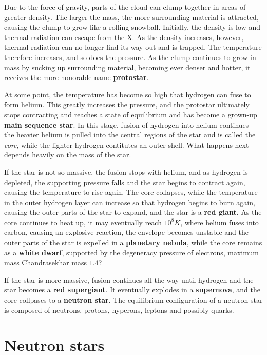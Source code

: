 Due to the force of gravity, parts of the cloud can clump together in areas of greater density.
The larger the mass, the more surrounding material is attracted, causing the clump to grow like a rolling snowball.
Initially, the density is low and thermal radiation can escape from the X.
As the density increases, however, thermal radiation can no longer find its way out and is trapped.
The temperature therefore increases, and so does the pressure.
As the clump continues to grow in mass by sucking up surrounding material, becoming ever denser and hotter, it receives the more honorable name \textbf{protostar}.

At some point, the temperature has become so high that hydrogen can fuse to form helium.
This greatly increases the pressure, and the protostar ultimately stops contracting and reaches a state of equilibrium and has become a grown-up \textbf{main sequence star}.
In this stage, fusion of hydrogen into helium continues -- the heavier helium is pulled into the central regions of the star and is called the \emph{core}, while the lighter hydrogen contitutes an outer shell.
What happens next depends heavily on the mass of the star.

If the star is not so massive, the fusion stops with helium, and as hydrogen is depleted, the supporting pressure falls and the star begins to contract again, causing the temperature to rise again.
The core collapses, while the temperature in the outer hydrogen layer can increase so that hydrogen begins to burn again, causing the outer parts of the star to expand, and the star is a \textbf{red giant}.
As the core continues to heat up, it may eventually reach $10^8 K$, where helium fuses into carbon, causing an explosive reaction, the envelope becomes unstable and the outer parts of the star is expelled in a \textbf{planetary nebula}, while the core remains as a \textbf{white dwarf}, supported by the degeneracy pressure of electrons, maximum mass Chandrasekhar mass $1.4$?

If the star is more massive, fusion continues all the way until hydrogen and the star becomes a \textbf{red supergiant}.
It eventually explodes in a \textbf{supernova}, and the core collpases to a \textbf{neutron star}.
The equilibrium configuration of a neutron star is composed of neutrons, protons, hyperons, leptons and possibly quarks.

\section*{Neutron stars}


